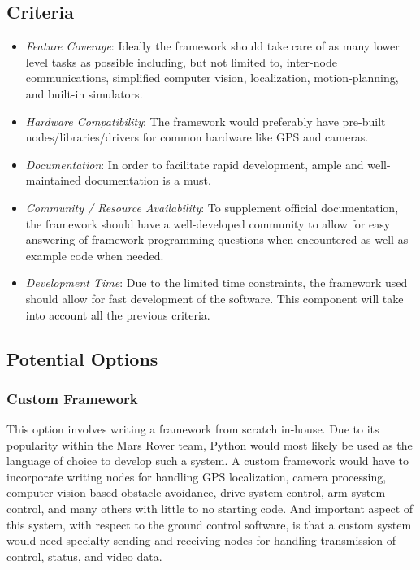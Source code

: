 \documentclass[onecolumn, draftclsnofoot, 10pt, compsoc]{IEEEtran}
\begin{document}
\subsection{Criteria}
\begin{itemize}
\item \textit{Feature Coverage}: Ideally the framework should take care of as many lower level tasks as possible including, but not limited to, inter-node communications, simplified computer vision, localization, motion-planning, and built-in simulators.
\item \textit{Hardware Compatibility}: The framework would preferably have pre-built nodes/libraries/drivers for common hardware like GPS and cameras.
\item \textit{Documentation}: In order to facilitate rapid development, ample and well-maintained documentation is a must.
\item \textit{Community / Resource Availability}: To supplement official documentation, the framework should have a well-developed community to allow for easy answering of framework programming questions when encountered as well as example code when needed.
\item \textit{Development Time}: Due to the limited time constraints, the framework used should allow for fast development of the software.
This component will take into account all the previous criteria.
\end{itemize}

\subsection{Potential Options}
\subsubsection{Custom Framework}
This option involves writing a framework from scratch in-house. 
Due to its popularity within the Mars Rover team, Python would most likely be used as the language of choice to develop such a system.
A custom framework would have to incorporate writing nodes for handling GPS localization, camera processing, computer-vision based obstacle avoidance, drive system control, arm system control, and many others with little to no starting code. 
And important aspect of this system, with respect to the ground control software, is that a custom system would need specialty sending and receiving nodes for handling transmission of control, status, and video data.
\end{document}
